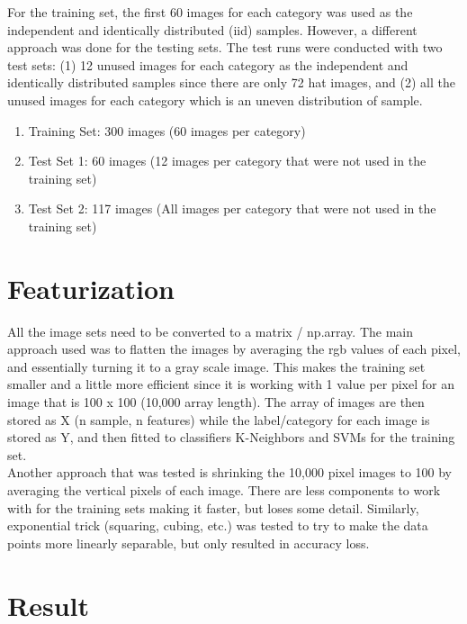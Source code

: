 \documentclass{article}
\begin{document}
  For the training set, the first 60 images for each category was used as the independent and identically distributed (iid) samples. However, a different approach was done for the testing sets. The test runs were conducted with two test sets: (1) 12 unused images for each category as the independent and identically distributed samples since there are only 72 hat images, and (2) all the unused images for each category which is an uneven distribution of sample.
  
  \begin{enumerate}
  	\item Training Set: 300 images (60 images per category)
  	\item Test Set 1: 60 images (12 images per category that were not used in the training set)
  	\item Test Set 2: 117 images (All images per category that were not used in the training set)
  \end{enumerate}
  
  \section{Featurization}
  
  All the image sets need to be converted to a matrix / np.array. The main approach used was to flatten the images by averaging the rgb values of each pixel, and essentially turning it to a  gray scale image. This makes the training set smaller and a little more efficient since it is working with 1 value per pixel for an image that is 100 x 100 (10,000 array length). The array of images are then stored as X (n sample, n features) while the label/category for each image is stored as Y, and then fitted to classifiers K-Neighbors and SVMs for the training set.\\
  
  Another approach that was tested is shrinking the 10,000 pixel images to 100 by averaging the vertical pixels of each image. There are less components to work with for the training sets making it faster, but loses some detail. Similarly, exponential trick (squaring, cubing, etc.) was tested to try to make the data points more linearly separable, but only resulted in accuracy loss.
  
  
  \section{Result}
   
\end{document}
